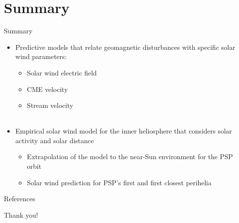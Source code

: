\section{Summary}

\begin{frame}[c]{Summary}{}
	
	\begin{itemize}%
		\item Predictive models that relate geomagnetic disturbances with specific solar wind parameters:
		\begin{itemize}
			\item Solar wind electric field
			\item CME velocity
			\item Stream velocity\\\ 
		\end{itemize}
		\item Empirical solar wind model for the inner heliosphere that considers solar activity and solar distance
		\begin{itemize}%
			\item Extrapolation of the model to the near-Sun environment for the PSP orbit
			\item Solar wind prediction for PSP's first and first closest perihelia
		\end{itemize}
	\end{itemize}
	
\end{frame}
\begin{frame}[t,allowframebreaks]{References}
	\tiny
	\begin{thebibliography}{10}
	
		\beamertemplatebookbibitems
		
		\beamertemplatearticlebibitems
		
		

	\end{thebibliography}
\end{frame}
{
\begin{frame}[c,plain]{}{}
	\centering
	\Large Thank you!
\end{frame}
}


